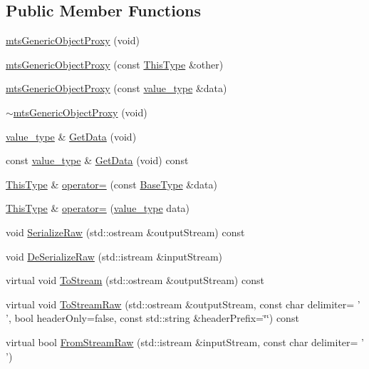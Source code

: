 \subsection*{Public Member Functions}
\begin{DoxyCompactItemize}
\item 
\hyperlink{classmts_generic_object_proxy_ac0ccce059304bd1ec05a51085829a805}{mts\-Generic\-Object\-Proxy} (void)
\item 
\hyperlink{classmts_generic_object_proxy_a6fd8d80a403b92c6466155a613ad1033}{mts\-Generic\-Object\-Proxy} (const \hyperlink{classmts_generic_object_proxy_base_adfa837044848485e7241e56816a74083}{This\-Type} \&other)
\item 
\hyperlink{classmts_generic_object_proxy_a94181dcfd327597df5042d21738d1ace}{mts\-Generic\-Object\-Proxy} (const \hyperlink{classmts_generic_object_proxy_a4c47d4b184e02d7443de1face033af34}{value\-\_\-type} \&data)
\item 
\hyperlink{classmts_generic_object_proxy_ac4bbb9f96ef9a63383e23c5407930dce}{$\sim$mts\-Generic\-Object\-Proxy} (void)
\item 
\hyperlink{classmts_generic_object_proxy_a4c47d4b184e02d7443de1face033af34}{value\-\_\-type} \& \hyperlink{classmts_generic_object_proxy_ab55dbcddbcd3b9db0e8e4326b63a8cf1}{Get\-Data} (void)
\item 
const \hyperlink{classmts_generic_object_proxy_a4c47d4b184e02d7443de1face033af34}{value\-\_\-type} \& \hyperlink{classmts_generic_object_proxy_ae845cb9d57238d227c98a25d08d54dff}{Get\-Data} (void) const 
\item 
\hyperlink{classmts_generic_object_proxy_base_adfa837044848485e7241e56816a74083}{This\-Type} \& \hyperlink{classmts_generic_object_proxy_abe0a80b1ba8c341a88c3883a1a0dfaf8}{operator=} (const \hyperlink{classcmn_generic_object}{Base\-Type} \&data)
\item 
\hyperlink{classmts_generic_object_proxy_base_adfa837044848485e7241e56816a74083}{This\-Type} \& \hyperlink{classmts_generic_object_proxy_a3a460aa4223fafdab54875e316a9eb81}{operator=} (\hyperlink{classmts_generic_object_proxy_a4c47d4b184e02d7443de1face033af34}{value\-\_\-type} data)
\item 
void \hyperlink{classmts_generic_object_proxy_acde3a483210a45b72db91d8e01a04f36}{Serialize\-Raw} (std\-::ostream \&output\-Stream) const 
\item 
void \hyperlink{classmts_generic_object_proxy_a34d00d099372fc845d6d7fa634e6dbaf}{De\-Serialize\-Raw} (std\-::istream \&input\-Stream)
\item 
virtual void \hyperlink{classmts_generic_object_proxy_a198823be05cc4e5e0af85d8a5f02d42a}{To\-Stream} (std\-::ostream \&output\-Stream) const 
\item 
virtual void \hyperlink{classmts_generic_object_proxy_a96c250631c96b2b63338e3304da78777}{To\-Stream\-Raw} (std\-::ostream \&output\-Stream, const char delimiter= ' ', bool header\-Only=false, const std\-::string \&header\-Prefix=\char`\"{}\char`\"{}) const 
\item 
virtual bool \hyperlink{classmts_generic_object_proxy_a42a8b93d9101b6112b6845d5e42c3969}{From\-Stream\-Raw} (std\-::istream \&input\-Stream, const char delimiter= ' ')
\end{DoxyCompactItemize}
